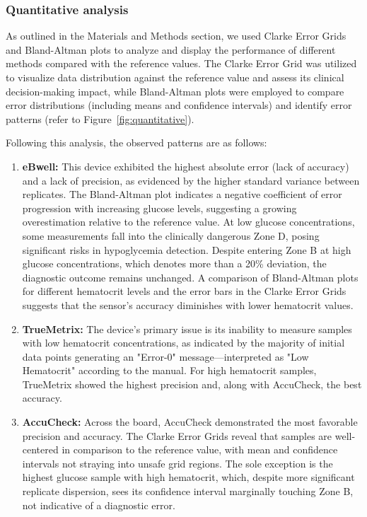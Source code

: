 \documentclass[conference]{IEEEtran}
\begin{document}
 \subsubsection{Quantitative analysis}
 As outlined in the Materials and Methods section, we used Clarke Error Grids and Bland-Altman plots to analyze and display the performance of different methods compared with the reference values. 
 The Clarke Error Grid was utilized to visualize data distribution against the reference value and assess its clinical decision-making impact, while Bland-Altman plots were employed to compare
 error distributions (including means and confidence intervals) and identify error patterns (refer to Figure~\ref{fig:quantitative}).

 Following this analysis, the observed patterns are as follows:
 
 \begin{enumerate}
     \item \textbf{eBwell:} This device exhibited the highest absolute error (lack of accuracy) and a lack of precision, as evidenced by the higher standard variance between 
     replicates. The Bland-Altman plot indicates a negative coefficient of error progression with increasing glucose levels, suggesting a growing overestimation relative to 
     the reference value. At low glucose concentrations, some measurements fall into the clinically dangerous Zone D, posing significant risks in hypoglycemia detection. 
     Despite entering Zone B at high glucose concentrations, which denotes more than a 20\% deviation, the diagnostic outcome remains unchanged. A comparison of Bland-Altman 
     plots for different hematocrit levels and the error bars in the Clarke Error Grids suggests that the sensor's accuracy diminishes with lower hematocrit values.
     
     \item \textbf{TrueMetrix:} The device's primary issue is its inability to measure samples with low hematocrit concentrations, as indicated by the majority of initial data
      points generating an "Error-0" message—interpreted as "Low Hematocrit" according to the manual. For high hematocrit samples, TrueMetrix showed the highest precision and, 
      along with AccuCheck, the best accuracy.
     
     \item \textbf{AccuCheck:} Across the board, AccuCheck demonstrated the most favorable precision and accuracy. The Clarke Error Grids reveal that samples are well-centered
      in comparison to the reference value, with mean and confidence intervals not straying into unsafe grid regions. The sole exception is the highest glucose sample with high
       hematocrit, which, despite more significant replicate dispersion, sees its confidence interval marginally touching Zone B, not indicative of a diagnostic error.
 \end{enumerate}
\end{document}
